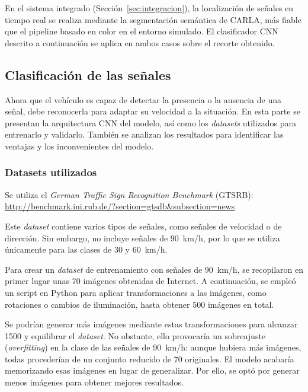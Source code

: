 \documentclass[12pt, a4paper]{article}
\begin{document}
En el sistema integrado (Sección~\ref{sec:integracion}), la localización de señales en tiempo real se realiza mediante la segmentación semántica de CARLA, más fiable que el pipeline basado en color en el entorno simulado. El clasificador CNN descrito a continuación se aplica en ambos casos sobre el recorte obtenido.

\subsection{Clasificación de las señales}

Ahora que el vehículo es capaz de detectar la presencia o la ausencia de una señal, debe reconocerla para adaptar su velocidad a la situación. 
En esta parte se presentan la arquitectura CNN del modelo, así como los \textit{datasets} utilizados para entrenarlo y validarlo. También se analizan los resultados
para identificar las ventajas y los inconvenientes del modelo. 

\subsubsection{Datasets utilizados}

Se utiliza el \textit{German Traffic Sign Recognition Benchmark} (GTSRB): \url{http://benchmark.ini.rub.de/?section=gtsdb&subsection=news}

Este \textit{dataset} contiene varios tipos de señales, como señales de velocidad o de dirección. Sin embargo, no incluye señales de 90~km/h, por lo que se 
utiliza únicamente para las clases de 30 y 60~km/h.

Para crear un \textit{dataset} de entrenamiento con señales de 90~km/h, se recopilaron en primer lugar unas 70 imágenes obtenidas de Internet. A continuación, se empleó un script en Python para aplicar transformaciones a las imágenes, como rotaciones o cambios de iluminación, hasta obtener 500 imágenes en total. 

Se podrían generar más imágenes mediante estas transformaciones para alcanzar 1500 y equilibrar el \textit{dataset}. No obstante, ello provocaría un sobreajuste (\textit{overfitting}) en la clase de las señales de 90~km/h: aunque hubiera más imágenes, todas procederían de un conjunto reducido de 
70 originales. El modelo acabaría memorizando esas imágenes en lugar de generalizar. Por ello, se optó por generar menos imágenes para obtener mejores resultados.
\end{document}
